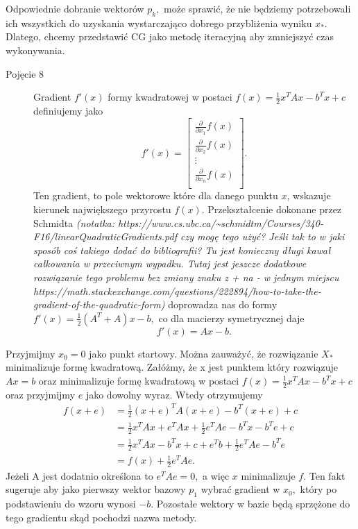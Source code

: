 \documentclass[a4paper,12pt]{book} %
\begin{document}
Odpowiednie dobranie wektorów $p_k,$ może sprawić, że nie będziemy potrzebowali ich wszystkich do uzyskania wystarczająco dobrego przybliżenia wyniku $x_*.$ Dlatego, chcemy przedstawić CG jako metodę iteracyjną aby zmniejszyć czas wykonywania.

\begin{description}
\item[Pojęcie 8] Gradient $f'(x)$ formy kwadratowej w postaci $f(x) = \frac{1}{2}x^TAx - b^Tx + c$ definiujemy jako
\[
f'(x) = 
\begin{bmatrix}
\frac{\partial }{\partial x_1}f(x) \\
\frac{\partial }{\partial x_2}f(x) \\
\vdots \\
\frac{\partial }{\partial x_n}f(x) \\
\end{bmatrix}
.
\]
Ten gradient, to pole wektorowe które dla danego punktu $x$, wskazuje kierunek największego przyrostu $f(x)$. Przekształcenie dokonane przez Schmidta \cite{gradient_quadratic} \emph{(notatka: https://www.cs.ubc.ca/\textasciitilde schmidtm/Courses/340-F16/linearQuadraticGradients.pdf czy mogę tego użyć? Jeśli tak to w jaki sposób coś takiego dodać do bibliografii? Tu jest konieczny długi kawał całkowania w przeciwnym wypadku. Tutaj jest jeszcze dodatkowe rozwiązanie tego problemu bez zmiany znaku z + na - w jednym miejscu https://math.stackexchange.com/questions/222894/how-to-take-the-gradient-of-the-quadratic-form)}
doprowadza nas do formy $f'(x) = \frac{1}{2}(A^T + A)x - b,$ co dla macierzy symetrycznej daje
$$f'(x) = Ax - b.$$
\end{description}

Przyjmijmy $x_0 = 0$ jako punkt startowy. Można zauważyć, że rozwiązanie $X_*$ minimalizuje formę kwadratową. Załóżmy, że x jest punktem który rozwiązuje $Ax = b$ oraz minimalizuje formę kwadratową w postaci $f(x) = \frac{1}{2}x^TAx - b^Tx + c$ oraz przyjmijmy $e$ jako dowolny wyraz. Wtedy otrzymujemy
\begin{align*}
f(x + e) &= \frac{1}{2}(x + e)^TA(x+e)-b^T(x+e)+c \\
	&= \frac{1}{2}x^TAx+e^TAx+\frac{1}{2}e^TAe-b^Tx - b^Te+c \\
	&= \frac{1}{2}x^TAx-b^Tx+c+e^Tb+\frac{1}{2}e^TAe-b^Te \\
	&= f(x) + \frac{1}{2}e^TAe.
\end{align*}
Jeżeli A jest dodatnio określona to $e^TAe = 0,$ a więc $x$ minimalizuje $f.$
Ten fakt sugeruje aby jako pierwszy wektor bazowy $p_1$ wybrać gradient w $x_0,$ który po podstawieniu do wzoru wynosi $-b.$ Pozostałe wektory w bazie będą sprzężone do tego gradientu skąd pochodzi nazwa metody. 
\end{document}
